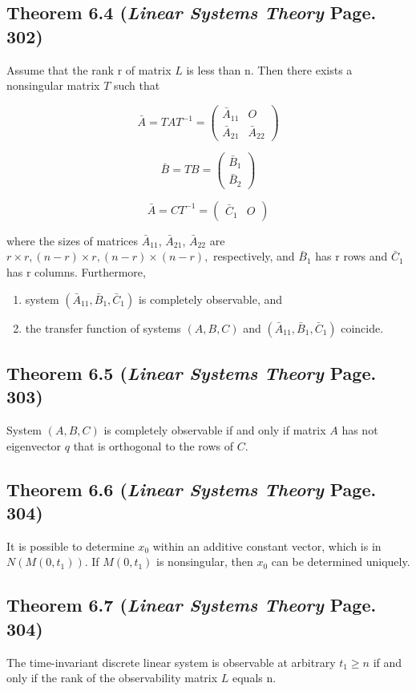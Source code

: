 \documentclass[12pt]{article}
\begin{document}
\subsection*{Theorem 6.4 ({\em Linear Systems Theory} Page. 302)}
Assume that the rank r of matrix $L$ is less than n. Then there exists a nonsingular matrix $T$ such that

$$\bar{A}=TAT^{-1}=\begin{pmatrix}
\bar{A}_{11} & O \\
\bar{A}_{21} & \bar{A}_{22}
\end{pmatrix}
$$

$$\bar{B}=TB=\begin{pmatrix}
\bar{B}_{1}\\
\bar{B}_{2}
\end{pmatrix}
$$

$$\bar{A}=CT^{-1}=\begin{pmatrix}
\bar{C}_{1} & O 
\end{pmatrix}
$$

\noindent
where the sizes of matrices $\bar{A}_{11}$, $\bar{A}_{21}$, $\bar{A}_{22}$ are $r\times r, (n-r)\times r, (n-r)\times (n-r),$ respectively, and $\bar{B}_1$ has r rows and $\bar{C}_1$ has r columns. Furthermore,
\renewcommand{\labelenumiii}{\Roman{enumii}}
\begin{enumerate}
  \item system $(\bar{A}_{11}, \bar{B}_1, \bar{C}_1)$ is completely observable, and
  \item the transfer function of systems $(A, B, C)$ and $(\bar{A}_{11}, \bar{B}_1, \bar{C}_1)$ coincide.
\end{enumerate}

\subsection*{Theorem 6.5 ({\em Linear Systems Theory} Page. 303)}
System $(A, B, C)$ is completely observable if and only if matrix $A$ has not eigenvector $q$ that is orthogonal to the rows of $C$.

\subsection*{Theorem 6.6 ({\em Linear Systems Theory} Page. 304)}
It is possible to determine $x_0$ within an additive constant vector, which is in $N(M(0,t_1))$. If $M(0,t_1)$ is nonsingular, then $x_0$ can be determined uniquely. 

\subsection*{Theorem 6.7 ({\em Linear Systems Theory} Page. 304)}
The time-invariant discrete linear system is observable at arbitrary $t_1\geq n$ if and only if the rank of the observability matrix $L$ equals n.
\end{document}
